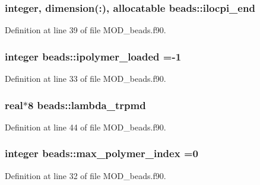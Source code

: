 \hypertarget{classbeads_a1c58398ef2bd90b96fbfbe11a26c7b00}{
\subsubsection[{ilocpi\-\_\-end}]{\setlength{\rightskip}{0pt plus 5cm}integer, dimension(\-:), allocatable beads\-::ilocpi\-\_\-end}}\label{classbeads_a1c58398ef2bd90b96fbfbe11a26c7b00}


Definition at line 39 of file M\-O\-D\-\_\-beads.\-f90.

\hypertarget{classbeads_ac483e5724b9ae3832d38222a33f15557}{
\subsubsection[{ipolymer\-\_\-loaded}]{\setlength{\rightskip}{0pt plus 5cm}integer beads\-::ipolymer\-\_\-loaded =-\/1}}\label{classbeads_ac483e5724b9ae3832d38222a33f15557}


Definition at line 33 of file M\-O\-D\-\_\-beads.\-f90.

\hypertarget{classbeads_a2aa911564d0335b29226af2e3e3aac96}{
\subsubsection[{lambda\-\_\-trpmd}]{\setlength{\rightskip}{0pt plus 5cm}real$\ast$8 beads\-::lambda\-\_\-trpmd}}\label{classbeads_a2aa911564d0335b29226af2e3e3aac96}


Definition at line 44 of file M\-O\-D\-\_\-beads.\-f90.

\hypertarget{classbeads_a5f339ae3ed13a47d482c85a859c6abef}{
\subsubsection[{max\-\_\-polymer\-\_\-index}]{\setlength{\rightskip}{0pt plus 5cm}integer beads\-::max\-\_\-polymer\-\_\-index =0}}\label{classbeads_a5f339ae3ed13a47d482c85a859c6abef}


Definition at line 32 of file M\-O\-D\-\_\-beads.\-f90.

